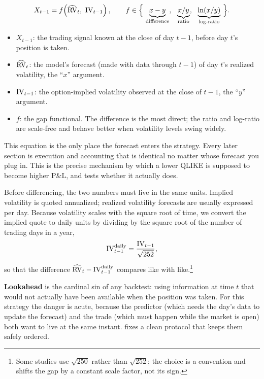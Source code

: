 \begin{equation}
\label{eq:ivrv:signal}
X_{t-1} = f\!\left(\widehat{\RV}_t,\ \IVol_{t-1}\right),
\qquad
f \in \Big\{\, \underbrace{x - y}_{\text{difference}},\ \ \underbrace{x/y}_{\text{ratio}},\ \ \underbrace{\ln(x/y)}_{\text{log-ratio}} \,\Big\}.
\end{equation}

\begin{itemize}
  \item $X_{t-1}$: the trading signal known at the close of day $t-1$, before day $t$'s position is taken.
  \item $\widehat{\operatorname{RV}}_t$: the model's forecast (made with data through $t-1$) of day $t$'s realized volatility, the ``$x$'' argument.
  \item $\operatorname{IV}_{t-1}$: the option-implied volatility observed at the close of $t-1$, the ``$y$'' argument.
  \item $f$: the gap functional. The difference is the most direct; the ratio and log-ratio are scale-free and behave better when volatility levels swing widely.
\end{itemize}

\begin{projectconnection}
This equation is the only place the forecast enters the strategy. Every later section is execution and accounting that is identical no matter whose forecast you plug in. This is the precise mechanism by which a lower QLIKE is supposed to become higher P\&L, and  tests whether it actually does.
\end{projectconnection}

Before differencing, the two numbers must live in the same units. Implied volatility is quoted annualized; realized volatility forecasts are usually expressed per day. Because volatility scales with the square root of time, we convert the implied quote to daily units by dividing by the square root of the number of trading days in a year,
\begin{equation}
\label{eq:ivrv:deannualize}
\operatorname{IV}^{\text{daily}}_{t-1} = \frac{\operatorname{IV}_{t-1}}{\sqrt{252}},
\end{equation}
so that the difference $\widehat{\operatorname{RV}}_t - \operatorname{IV}^{\text{daily}}_{t-1}$ compares like with like.\footnote{Some studies use $\sqrt{250}$ rather than $\sqrt{252}$; the choice is a convention and shifts the gap by a constant scale factor, not its sign.}

\textbf{Lookahead} is the cardinal sin of any backtest: using information at time $t$ that would not actually have been available when the position was taken. For this strategy the danger is acute, because the predictor (which needs the day's data to update the forecast) and the trade (which must happen while the market is open) both want to live at the same instant. \citet{Pollok2025} fixes a clean protocol that keeps them safely ordered.

